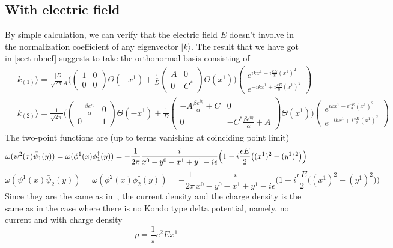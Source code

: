 \subsection{With electric field}
By simple calculation, we can verify that the electric field $E$ doesn't involve in the normalization coefficient of any eigenvector $ | k \rangle$. The result that we have got in \cref{sect-nbnef} suggests to take the orthonormal basis consisting of
\begin{equation}
\begin{split}
& | k_{(1)} \rangle = \frac{|D|}{\sqrt{2\pi}A}\bigg( \begin{pmatrix} 1 & 0 \\ 0 & 0 \end{pmatrix}
\Theta(-x^1) + 
\frac{1}{D}\begin{pmatrix} A & 0 \\  0 & C^* \end{pmatrix} \Theta(x^1) \bigg)
\begin{pmatrix} e^{ikx^1 - i\frac{eE}{8}(x^1)^2}  \\ e^{-ikx^1 + i\frac{eE}{8}(x^1)^2} \end{pmatrix}   \\
& | k_{(2)} \rangle = \frac{1}{\sqrt{2\pi}}
\Bigg( \begin{pmatrix} -\frac{\beta e^{i\eta}}{\alpha} & 0 \\ 0 & 1 \end{pmatrix}
\Theta(-x^1) + 
\frac{1}{D}\begin{pmatrix} -A\frac{\beta e^{i\eta}}{\alpha} + C  & 0\\ 0&  -C^*\frac{\beta e^{i\eta}}{\alpha} + A  \end{pmatrix} \Theta(x^1) \Bigg)
\begin{pmatrix} e^{ikx^1 -i\frac{eE}{2}(x^1)^2}  \\  e^{-ikx^1 +i\frac{eE}{2}(x^1)^2}  \end{pmatrix}  
\end{split}
\end{equation}
The two-point functions are (up to terms vanishing at coinciding point limit)
\begin{equation*}
\omega(\psi^2(x)\bar{\psi}_1(y)) =  \omega(\phi^1(x)\phi^\dagger_1(y)) \\ = -\frac{1}{2\pi}\frac{i}{x^0 - y^0 - x^1 + y^1 - i\epsilon} \Big(1 -  i\frac{eE}{2}\big((x^1)^2 - (y^1)^2 \big) \Big) 
\end{equation*}
\begin{equation*}
\omega(\psi^1(x)\bar{\psi}_2(y))   =  \omega(\phi^2(x)\phi^\dagger_2(y)) = -\frac{1}{2\pi}\frac{i}{x^0 - y^0 - x^1 + y^1 - i\epsilon} \Big(1 + i\frac{eE}{2}\big((x^1)^2 - (y^1)^2 \big) \Big)
\end{equation*}
Since they are the same as in~\cite{Zahn2015}, the current density and the charge density is the same as in the case where there is no Kondo type delta potential, namely, no current and with charge density 
\begin{equation}\label{vacuum-charge_nbdy}
\rho = \frac{1}{\pi} e^2 E x^1
\end{equation}
